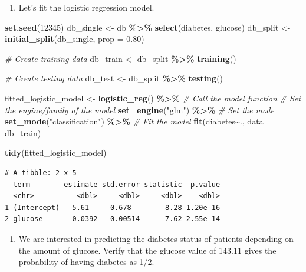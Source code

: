 \documentclass[
]{book}
\newenvironment{Shaded}{\begin{snugshade}}{\end{snugshade}}
\newcommand{\AttributeTok}[1]{\textcolor[rgb]{0.13,0.29,0.53}{#1}}
\newcommand{\CommentTok}[1]{\textcolor[rgb]{0.56,0.35,0.01}{\textit{#1}}}
\newcommand{\DecValTok}[1]{\textcolor[rgb]{0.00,0.00,0.81}{#1}}
\newcommand{\FloatTok}[1]{\textcolor[rgb]{0.00,0.00,0.81}{#1}}
\newcommand{\FunctionTok}[1]{\textcolor[rgb]{0.13,0.29,0.53}{\textbf{#1}}}
\newcommand{\NormalTok}[1]{#1}
\newcommand{\OtherTok}[1]{\textcolor[rgb]{0.56,0.35,0.01}{#1}}
\newcommand{\SpecialCharTok}[1]{\textcolor[rgb]{0.81,0.36,0.00}{\textbf{#1}}}
\newcommand{\StringTok}[1]{\textcolor[rgb]{0.31,0.60,0.02}{#1}}
\providecommand{\tightlist}{%
  \setlength{\itemsep}{0pt}\setlength{\parskip}{0pt}}
\begin{document}
\begin{enumerate}
\def\labelenumi{\alph{enumi}.}
\tightlist
\item
  Let's fit the logistic regression model.
\end{enumerate}

\begin{Shaded}
\begin{Highlighting}[]
\FunctionTok{set.seed}\NormalTok{(}\DecValTok{12345}\NormalTok{)}
\NormalTok{db\_single }\OtherTok{\textless{}{-}}\NormalTok{ db }\SpecialCharTok{\%\textgreater{}\%} \FunctionTok{select}\NormalTok{(diabetes, glucose)}
\NormalTok{db\_split }\OtherTok{\textless{}{-}} \FunctionTok{initial\_split}\NormalTok{(db\_single, }\AttributeTok{prop =} \FloatTok{0.80}\NormalTok{)}

\CommentTok{\# Create training data}
\NormalTok{db\_train }\OtherTok{\textless{}{-}}\NormalTok{ db\_split }\SpecialCharTok{\%\textgreater{}\%} \FunctionTok{training}\NormalTok{()}

\CommentTok{\# Create testing data}
\NormalTok{db\_test }\OtherTok{\textless{}{-}}\NormalTok{ db\_split }\SpecialCharTok{\%\textgreater{}\%} \FunctionTok{testing}\NormalTok{()}

\NormalTok{fitted\_logistic\_model }\OtherTok{\textless{}{-}} \FunctionTok{logistic\_reg}\NormalTok{() }\SpecialCharTok{\%\textgreater{}\%} \CommentTok{\# Call the model function}
        \CommentTok{\# Set the engine/family of the model}
        \FunctionTok{set\_engine}\NormalTok{(}\StringTok{"glm"}\NormalTok{) }\SpecialCharTok{\%\textgreater{}\%}
        \CommentTok{\# Set the mode}
        \FunctionTok{set\_mode}\NormalTok{(}\StringTok{"classification"}\NormalTok{) }\SpecialCharTok{\%\textgreater{}\%}
        \CommentTok{\# Fit the model}
        \FunctionTok{fit}\NormalTok{(diabetes}\SpecialCharTok{\textasciitilde{}}\NormalTok{., }\AttributeTok{data =}\NormalTok{ db\_train)}

\FunctionTok{tidy}\NormalTok{(fitted\_logistic\_model)}
\end{Highlighting}
\end{Shaded}

\begin{verbatim}
# A tibble: 2 x 5
  term        estimate std.error statistic  p.value
  <chr>          <dbl>     <dbl>     <dbl>    <dbl>
1 (Intercept)  -5.61     0.678       -8.28 1.20e-16
2 glucose       0.0392   0.00514      7.62 2.55e-14
\end{verbatim}

\begin{enumerate}
\def\labelenumi{\alph{enumi}.}
\setcounter{enumi}{1}
\tightlist
\item
  We are interested in predicting the diabetes status of patients depending on the amount of glucose. Verify that the glucose value of 143.11 gives the probability of having diabetes as 1/2.
\end{enumerate}
\end{document}
